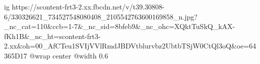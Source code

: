  
 
 
 
 

\ifcmt
  ig https://scontent-frt3-2.xx.fbcdn.net/v/t39.30808-6/330326621_734527548080408_2105542763600169858_n.jpg?_nc_cat=110&ccb=1-7&_nc_sid=8bfeb9&_nc_ohc=XQktTuSkQ_kAX-fKh1B&_nc_ht=scontent-frt3-2.xx&oh=00_AfCTeu1SVIjVVlRmdJBDVtblurvbz2UbtbTSjW0CtQl3oQ&oe=64365D17
  @wrap center
  @width 0.6
\fi
